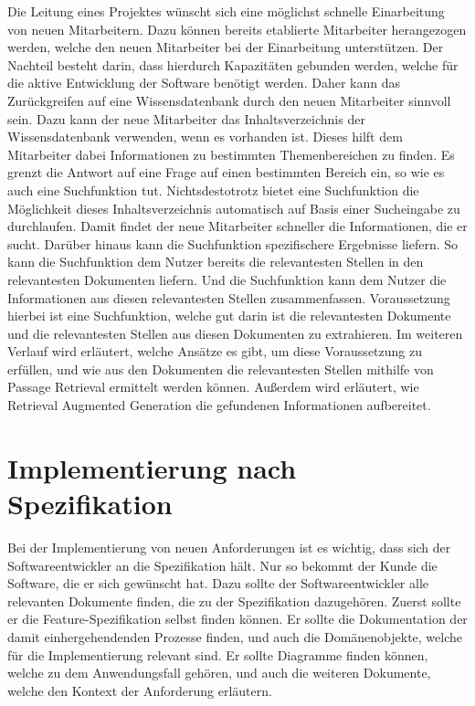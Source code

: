 Die Leitung eines Projektes wünscht sich eine möglichst schnelle Einarbeitung von neuen Mitarbeitern.
Dazu können bereits etablierte Mitarbeiter herangezogen werden, welche den neuen Mitarbeiter bei der Einarbeitung unterstützen.
Der Nachteil besteht darin, dass hierdurch Kapazitäten gebunden werden, welche für die aktive Entwicklung der Software benötigt werden.
Daher kann das Zurückgreifen auf eine Wissensdatenbank durch den neuen Mitarbeiter sinnvoll sein.
Dazu kann der neue Mitarbeiter das Inhaltsverzeichnis der Wissensdatenbank verwenden, wenn es vorhanden ist.
Dieses hilft dem Mitarbeiter dabei Informationen zu bestimmten Themenbereichen zu finden.
Es grenzt die Antwort auf eine Frage auf einen bestimmten Bereich ein, so wie es auch eine Suchfunktion tut.
Nichtsdestotrotz bietet eine Suchfunktion die Möglichkeit dieses Inhaltsverzeichnis automatisch auf Basis einer Sucheingabe zu durchlaufen.
Damit findet der neue Mitarbeiter schneller die Informationen, die er sucht.
Darüber hinaus kann die Suchfunktion spezifischere Ergebnisse liefern.
So kann die Suchfunktion dem Nutzer bereits die relevantesten Stellen in den relevantesten Dokumenten liefern.
Und die Suchfunktion kann dem Nutzer die Informationen aus diesen relevantesten Stellen zusammenfassen.
Voraussetzung hierbei ist eine Suchfunktion, welche gut darin ist die relevantesten Dokumente und die relevantesten Stellen aus diesen Dokumenten zu extrahieren.
Im weiteren Verlauf wird erläutert, welche Ansätze es gibt, um diese Voraussetzung zu erfüllen, und wie aus den Dokumenten die relevantesten Stellen mithilfe von Passage Retrieval ermittelt werden können.
Außerdem wird erläutert, wie Retrieval Augmented Generation die gefundenen Informationen aufbereitet.

\section{Implementierung nach Spezifikation}
Bei der Implementierung von neuen Anforderungen ist es wichtig, dass sich der Softwareentwickler an die Spezifikation hält.
Nur so bekommt der Kunde die Software, die er sich gewünscht hat.
Dazu sollte der Softwareentwickler alle relevanten Dokumente finden, die zu der Spezifikation dazugehören.
Zuerst sollte er die Feature-Spezifikation selbst finden können.
Er sollte die Dokumentation der damit einhergehendenden Prozesse finden, und auch die Domänenobjekte, welche für die Implementierung relevant sind.
Er sollte Diagramme finden können, welche zu dem Anwendungsfall gehören, und auch die weiteren Dokumente, welche den Kontext der Anforderung erläutern.\\


